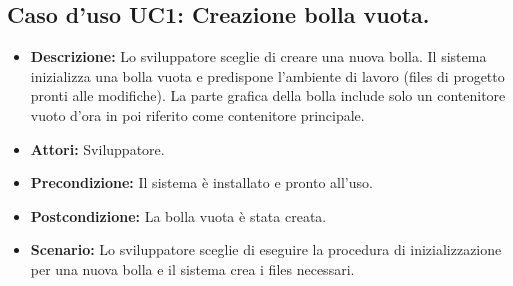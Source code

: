 \subsection{Caso d'uso UC1: Creazione bolla vuota.}
\begin{itemize}
\item[]\textbf{Descrizione:} Lo sviluppatore sceglie di creare una nuova bolla. Il sistema inizializza una bolla vuota e predispone l'ambiente di lavoro (files di progetto pronti alle modifiche). La parte grafica della bolla include solo un contenitore vuoto d'ora in poi riferito come contenitore principale.
\item[]\textbf{Attori:} Sviluppatore. 
\item[]\textbf{Precondizione:} Il sistema è installato e pronto all'uso. 
\item[]\textbf{Postcondizione:} La bolla vuota è stata creata. 
\item[]\textbf{Scenario:}
 Lo sviluppatore sceglie di eseguire la procedura di inizializzazione per una nuova bolla e il sistema crea i files necessari.

 
\end{itemize}

\clearpage

